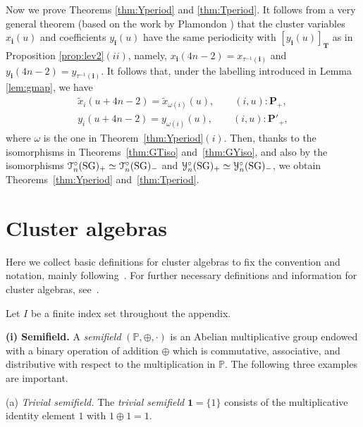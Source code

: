 \documentclass[11pt]{article}
\numberwithin{equation}{section}
\theoremstyle{definition}
\begin{document}
Now we prove
Theorems \ref{thm:Yperiod} and \ref{thm:Tperiod}.
It follows from  a very general theorem
\cite[Theorem 5.1]{Inoue10a}
(based on the work by Plamondon \cite{Plamondon10a,Plamondon10b})
that the cluster variables
$x_{\mathbf{i}}(u)$ and coef\/f\/icients $y_{\mathbf{i}}(u)$
have the same periodicity with
$[y_{\mathbf{i}}(u)]_{\mathbf{T}}$ as in Proposition \ref{prop:lev2}$(ii)$,
namely,
$x_{\mathbf{i}}(4n-2)=x_{\tau^{-1}(\mathbf{i})}$
and
$y_{\mathbf{i}}(4n-2)=y_{\tau^{-1}(\mathbf{i})}$.
It follows that, under the labelling introduced in Lemma
\ref{lem:gmap}, we have
\begin{gather}
\tilde{x}_i(u+4n-2) =\tilde{x}_{\omega(i)}(u),
\qquad (i,u):\mathbf{P}_+,\nonumber\\
y_i(u+4n-2) =y_{\omega(i)}(u),
\qquad (i,u):\mathbf{P}'_+,\label{eq:xperiod}
\end{gather}
where $\omega$ is the one in Theorem~\ref{thm:Yperiod}$(i)$.
Then, thanks to the isomorphisms
in Theorems~\ref{thm:GTiso} and~\ref{thm:GYiso},
and also by the isomorphisms
$\EuScript{T}^{\circ}_{n}(\mathrm{SG})_+
\simeq
\EuScript{T}^{\circ}_{n}(\mathrm{SG})_-
$
and
$\EuScript{Y}^{\circ}_{n}(\mathrm{SG})_+
\simeq
\EuScript{Y}^{\circ}_{n}(\mathrm{SG})_-
$,
we obtain
Theorems~\ref{thm:Yperiod} and~\ref{thm:Tperiod}.
\setcounter{section}{7}
\setcounter{subsection}{3}
\setcounter{subsubsection}{0}
\setcounter{Theorem}{11}
\setcounter{equation}{5}
\appendix
\section{Cluster algebras}

\label{sec:groc}

Here we collect basic def\/initions for cluster algebras
to f\/ix the convention and notation,
mainly following~\cite{Fomin07}.
For further necessary def\/initions and information
for cluster algebras, see~\cite{Fomin07}.

Let $I$ be a f\/inite index set throughout the appendix.

{\bf (i) Semif\/ield.}
A {\em semifield\/} $(\mathbb{P},\oplus, \cdot)$
is an Abelian multiplicative group
endowed with a binary
operation of addition $\oplus$ which is commutative,
associative, and distributive with respect to the
multiplication in $\mathbb{P}$.
The following three examples are important.


(a) {\em  Trivial semifield.}
The {\em trivial semifield\/}
$\mathbf{1}=\{\mathrm{1}\}$
consists of the multiplicative identity element $1$
with $1\oplus 1 = 1$.
\end{document}
